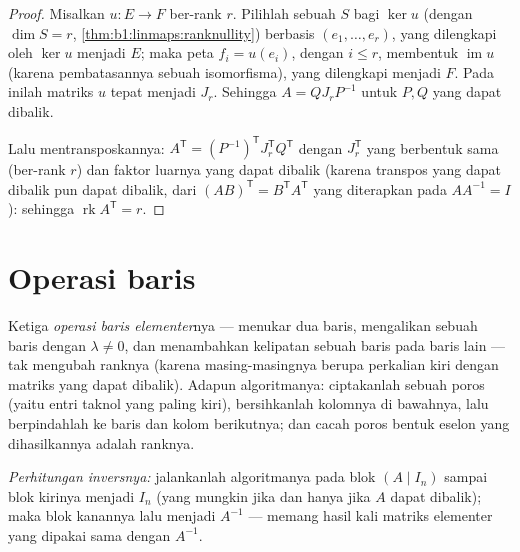 \begin{proof}
Misalkan $u \colon E \to F$ ber-rank $r$. Pilihlah sebuah  $S$ bagi
$\ker u$ (dengan $\dim S = r$, \cref{thm:b1:linmaps:ranknullity}) berbasis
$(e_1, \dots, e_r)$, yang dilengkapi oleh  $\ker u$ menjadi
 $E$; maka peta $f_i = u(e_i)$, dengan $i \leq r$, membentuk 
$\operatorname{im} u$ (karena pembatasannya sebuah isomorfisma), yang dilengkapi
menjadi  $F$. Pada  inilah matriks $u$ tepat menjadi
$J_r$. Sehingga $A = Q J_r P^{-1}$ untuk $P, Q$ yang dapat dibalik.

Lalu mentransposkannya: $A^{\mathsf T} = (P^{-1})^{\mathsf T} J_r^{\mathsf T} Q^{\mathsf T}$
dengan $J_r^{\mathsf T}$ yang berbentuk sama (ber-rank $r$) dan faktor
luarnya yang dapat dibalik (karena transpos yang dapat dibalik pun dapat dibalik, dari
$(AB)^{\mathsf T} = B^{\mathsf T}A^{\mathsf T}$ yang diterapkan pada $AA^{-1} = I$):
sehingga $\operatorname{rk} A^{\mathsf T} = r$.
\end{proof}

\section{Operasi baris}

\begin{method}\label{met:b1:matrices:gauss}
Ketiga \emph{operasi baris elementer}nya ---
menukar dua baris, mengalikan sebuah baris dengan $\lambda \neq 0$, dan menambahkan kelipatan
sebuah baris pada baris lain --- tak mengubah ranknya (karena masing-masingnya berupa
perkalian kiri dengan matriks yang dapat dibalik). Adapun algoritmanya: ciptakanlah sebuah poros
(yaitu entri taknol yang paling kiri), bersihkanlah kolomnya di bawahnya, lalu berpindahlah ke baris
dan kolom berikutnya; dan cacah poros bentuk eselon yang dihasilkannya
adalah ranknya.

\emph{Perhitungan inversnya:} jalankanlah algoritmanya pada blok $(A \mid
I_n)$ sampai blok kirinya menjadi $I_n$ (yang mungkin jika dan hanya jika $A$
dapat dibalik); maka blok kanannya lalu menjadi $A^{-1}$ --- memang hasil kali
matriks elementer yang dipakai sama dengan $A^{-1}$.
\end{method}

